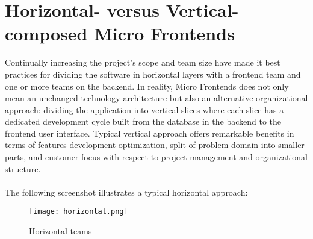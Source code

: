\documentclass[a4paper]{book}
\begin{document}
\section{Horizontal- versus Vertical-composed Micro Frontends}
Continually increasing the project's scope and team size have made it best practices for dividing the software in horizontal layers with a frontend team and one or more teams on the backend. In reality, Micro Frontends does not only mean an unchanged technology architecture but also an alternative organizational approach: dividing the application into vertical slices where each slice has a dedicated development cycle built from the database in the backend to the frontend user interface. Typical vertical approach offers remarkable benefits in terms of features development optimization, split of problem domain into smaller parts, and customer focus with respect to project management and organizational structure.
\\
\\
The following screenshot illustrates a typical horizontal approach: 

\begin{figure}[h!]
    \centering
    \captionsetup{justification=centering}
    \texttt{[image: horizontal.png]}
    \caption{Horizontal teams \cite{Rap20}}
    \label{fig:1}
\end{figure}
\end{document}

